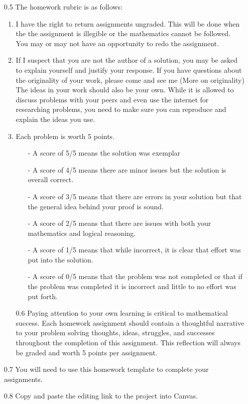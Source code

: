 \documentclass[12pt]{article}
\begin{document}
\begin{enumerate}
    \item[0.5] The homework rubric is as follows: 
    \begin{enumerate}
        \item I have the right to return assignments ungraded. This will be done when the the assignment is illegible or the mathematics cannot be followed. You may or may not have an opportunity to redo the assignment.
        \item If I suspect that you are not the author of a solution, you may be asked to explain yourself and justify your response. If you have questions about the originality of your work, please come and see me (More on originality) The ideas in your work should also be your own. While it is allowed to discuss problems with your peers and even use the internet for researching problems, you need to make sure you can reproduce and explain the ideas you use. 
        \item Each problem is worth 5 points.
        \begin{enumerate}
            \item[-] A score of 5/5 means the solution was exemplar
            \item[-] A score of 4/5 means there are minor issues but the solution is overall correct.
            \item[-] A score of 3/5 means that there are errors in your solution but that the general idea behind your proof is sound. 
            \item[-] A score of 2/5 means that there are issues with both your mathematics and logical reasoning. 
            \item[-] A score of 1/5 means that while incorrect, it is clear that effort was put into the solution.
            \item[-] A score of 0/5 means that the problem was not completed or that if the problem was completed it is incorrect and little to no effort was put forth. 
        \end{enumerate}
        \item[0.6] Paying attention to your own learning is critical to mathematical success. Each homework assignment should contain a thoughtful narrative to your problem solving thoughts, ideas, struggles, and successes throughout the completion of this assignment.  This reflection will always be graded and worth 5 points per assignment.
    \end{enumerate}
    \item[0.7] You will need to use this homework template to complete your assignments. 
    \item[0.8] Copy and paste the editing link to the project into Canvas.
\end{enumerate} 
\end{document}
